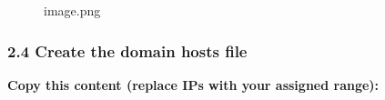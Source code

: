\begin{figure}
\centering
{}
\caption{image.png}
\end{figure}

\subsubsection{2.4 Create the domain hosts
file}\label{create-the-domain-hosts-file}

\begin{Shaded}
\begin{Highlighting}[]
\end{Highlighting}
\end{Shaded}

\textbf{Copy this content (replace IPs with your assigned range):}

